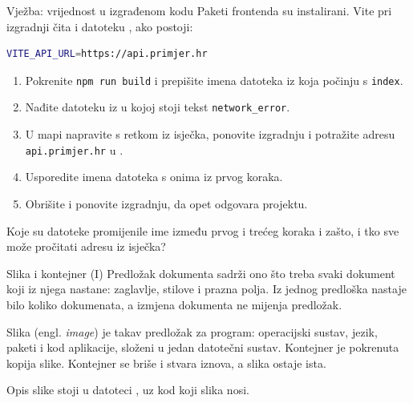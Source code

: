\begin{frame}[fragile]{Vježba: vrijednost u izgrađenom kodu}
Paketi frontenda su instalirani. Vite pri izgradnji čita i datoteku , ako postoji:

\begin{lstlisting}[language=bash]
VITE_API_URL=https://api.primjer.hr
\end{lstlisting}

\begin{enumerate}
  \itemsep0.15em
  \item Pokrenite \texttt{npm run build} i prepišite imena datoteka iz  koja počinju s \texttt{index}.
  \item Nađite datoteku iz  u kojoj stoji tekst \texttt{network\_error}.
  \item U mapi  napravite  s retkom iz isječka, ponovite izgradnju i potražite adresu \texttt{api.primjer.hr} u .
  \item Usporedite imena datoteka s onima iz prvog koraka.
  \item Obrišite  i ponovite izgradnju, da  opet odgovara projektu.
\end{enumerate}

\vspace{0.2em}
Koje su datoteke promijenile ime između prvog i trećeg koraka i zašto, i tko sve može pročitati adresu iz isječka?
\end{frame}


\begin{frame}{Slika i kontejner (I)}
Predložak dokumenta sadrži ono što treba svaki dokument koji iz njega nastane: zaglavlje, stilove i prazna polja. Iz jednog predloška nastaje bilo koliko dokumenata, a izmjena dokumenta ne mijenja predložak.

\vspace{0.9em}
Slika (engl. \emph{image}) je takav predložak za program: operacijski sustav, jezik, paketi i kod aplikacije, složeni u jedan datotečni sustav. Kontejner je pokrenuta kopija slike. Kontejner se briše i stvara iznova, a slika ostaje ista.

\vspace{0.9em}
Opis slike stoji u datoteci , uz kod koji slika nosi.
\end{frame}

